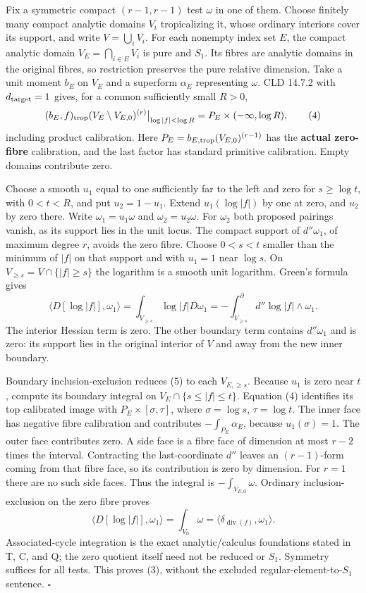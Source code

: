 \documentclass[
  10pt,
]{article}
\begin{document}
Fix a symmetric compact \((r-1,r-1)\) test \(\omega\) in one of them.
Choose finitely many compact analytic domains \(V_i\) tropicalizing it,
whose ordinary interiors cover its support, and write
\(V=\bigcup_iV_i\). For each nonempty index set \(E\), the compact
analytic domain \(V_E=\bigcap_{i\in E}V_i\) is pure and \(S_1\). Its
fibres are analytic domains in the original fibres, so restriction
preserves the pure relative dimension. Take a unit moment \(b_E\) on
\(V_E\) and a superform \(\alpha_E\) representing \(\omega\). CLD 14.7.2
with \(d_{\rm target}=1\) gives, for a common sufficiently small
\(R>0\), \[
 (b_E,f)_{\rm trop}(V_E\setminus V_{E,0})^{(r)}
     \big|_{\log|f|<\log R}
 =P_E\times(-\infty,\log R),                              \tag{4}
\] including product calibration. Here
\(P_E=b_{E,\rm trop}(V_{E,0})^{(r-1)}\) has the \textbf{actual
zero-fibre} calibration, and the last factor has standard primitive
calibration. Empty domains contribute zero.

Choose a smooth \(u_1\) equal to one sufficiently far to the left and
zero for \(s\geq\log t\), with \(0<t<R\), and put \(u_2=1-u_1\). Extend
\(u_1(\log|f|)\) by one at zero, and \(u_2\) by zero there. Write
\(\omega_1=u_1\omega\) and \(\omega_2=u_2\omega\). For \(\omega_2\) both
proposed pairings vanish, as its support lies in the unit locus. The
compact support of \(d''\omega_1\), of maximum degree \(r\), avoids the
zero fibre. Choose \(0<s<t\) smaller than the minimum of \(|f|\) on that
support and with \(u_1=1\) near \(\log s\). On
\(V_{\geq s}=V\cap\{|f|\geq s\}\) the logarithm is a smooth unit
logarithm. Green's formula gives \[
 \langle D[\log|f|],\omega_1\rangle
 =\int_{V_{\geq s}}\log|f|D\omega_1
 =-\int_{V_{\geq s}}^\partial d''\log|f|\wedge\omega_1.     \tag{5}
\] The interior Hessian term is zero. The other boundary term contains
\(d''\omega_1\) and is zero: its support lies in the original interior
of \(V\) and away from the new inner boundary.

Boundary inclusion-exclusion reduces (5) to each \(V_{E,\geq s}\).
Because \(u_1\) is zero near \(t\), compute its boundary integral on
\(V_E\cap\{s\leq|f|\leq t\}\). Equation (4) identifies its top
calibrated image with \(P_E\times[\sigma,\tau]\), where
\(\sigma=\log s\), \(\tau=\log t\). The inner face has negative fibre
calibration and contributes \(-\int_{P_E}\alpha_E\), because
\(u_1(\sigma)=1\). The outer face contributes zero. A side face is a
fibre face of dimension at most \(r-2\) times the interval. Contracting
the last-coordinate \(d''\) leaves an \((r-1)\)-form coming from that
fibre face, so its contribution is zero by dimension. For \(r=1\) there
are no such side faces. Thus the integral is \(-\int_{V_{E,0}}\omega\).
Ordinary inclusion-exclusion on the zero fibre proves \[
 \langle D[\log|f|],\omega_1\rangle
 =\int_{V_0}\omega
 =\langle\delta_{\operatorname{div}(f)},\omega_1\rangle.
\] Associated-cycle integration is the exact analytic/calculus
foundations stated in T, C, and Q; the zero quotient itself need not be
reduced or \(S_1\). Symmetry suffices for all tests. This proves (3),
without the excluded regular-element-to-\(S_1\) sentence. \(\square\)
\end{document}
